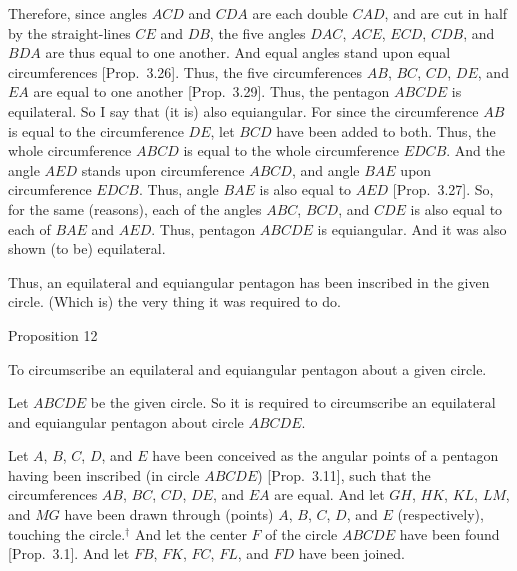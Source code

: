 Therefore, since angles $ACD$ and $CDA$ are each double $CAD$, and are cut
in half by the straight-lines $CE$ and $DB$, the five angles
$DAC$, $ACE$, $ECD$, $CDB$, and $BDA$ are thus equal to one another.
And equal angles stand upon equal circumferences [Prop.~3.26]. Thus, the five circumferences
$AB$, $BC$, $CD$, $DE$, and $EA$ are equal to one another [Prop.~3.29]. Thus, the pentagon
$ABCDE$ is equilateral. So I say that (it is) also equiangular. For since the
circumference $AB$ is equal to the circumference $DE$, let $BCD$ have been added to both. Thus, the whole circumference $ABCD$ is equal to the
whole circumference $EDCB$. And the angle $AED$ stands upon circumference
$ABCD$, and angle $BAE$ upon circumference $EDCB$. Thus, angle $BAE$ is
also equal to $AED$ [Prop.~3.27]. 
So, for the same (reasons), each of the angles $ABC$, $BCD$,  and $CDE$ is also equal
to each of $BAE$ and $AED$. Thus, pentagon $ABCDE$ is equiangular.
And it was also shown (to be) equilateral.

Thus, an equilateral and equiangular pentagon has been inscribed in the
given circle. (Which is) the very thing it was required to do.


\begin{center}
{\large Proposition 12}
\end{center}

To circumscribe an equilateral and equiangular
pentagon about a given circle.

\epsfysize=2in
\centerline{}

Let $ABCDE$ be the given circle. So it is required to circumscribe an
equilateral and equiangular pentagon about circle $ABCDE$. 

Let $A$, $B$, $C$, $D$,  and $E$ have been conceived as the angular points of a
pentagon having been inscribed (in circle $ABCDE$) [Prop.~3.11], such that the circumferences $AB$, $BC$, $CD$, $DE$, and
$EA$ are equal. And let $GH$, $HK$, $KL$, $LM$, and $MG$  have been drawn through
(points) $A$, $B$, $C$, $D$, and $E$ (respectively), touching the circle.$^\dag$ And let the center $F$
of the circle $ABCDE$ have been found [Prop.~3.1].
And let $FB$, $FK$, $FC$, $FL$, and $FD$ have been joined.


